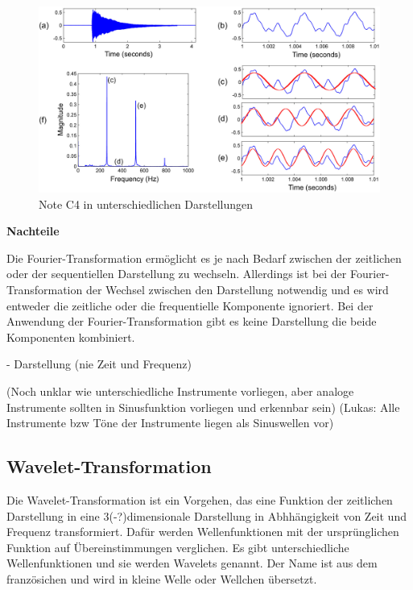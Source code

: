 %
\begin{figure}
\includegraphics[width=1\textwidth]{images/Fourier_math.PNG}
\caption{Note C4 in unterschiedlichen Darstellungen}
\label{fig:fourier}
\end{figure}
%

%
\textbf{Nachteile}
%
    
Die Fourier-Transformation ermöglicht es je nach Bedarf zwischen der zeitlichen oder der sequentiellen Darstellung zu wechseln. Allerdings ist bei der Fourier-Transformation der Wechsel zwischen den Darstellung notwendig und es wird entweder die zeitliche oder die frequentielle Komponente ignoriert. Bei der Anwendung der Fourier-Transformation gibt es keine Darstellung die beide Komponenten kombiniert.

    - Darstellung (nie Zeit und Frequenz)

(Noch unklar wie unterschiedliche Instrumente vorliegen, aber analoge Instrumente sollten in Sinusfunktion vorliegen und erkennbar sein)
(Lukas: Alle Instrumente bzw Töne der Instrumente liegen als Sinuswellen vor)

%
\subsection{Wavelet-Transformation}
\label{wavelet-transformation}
%

Die Wavelet-Transformation ist ein Vorgehen, das eine Funktion der zeitlichen Darstellung in eine 3(-?)dimensionale Darstellung in Abhhängigkeit von Zeit und Frequenz transformiert. Dafür werden Wellenfunktionen mit der ursprünglichen Funktion auf Übereinstimmungen verglichen. Es gibt unterschiedliche Wellenfunktionen und sie werden Wavelets genannt. Der Name ist aus dem französichen und wird in kleine Welle oder Wellchen übersetzt.

